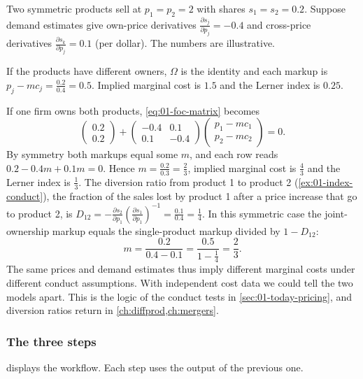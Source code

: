 \begin{example}\label{ex:01-two-products}
Two symmetric products sell at $p_1 = p_2 = 2$ with shares $s_1 = s_2 = 0.2$. Suppose demand estimates give
own-price derivatives $\frac{\partial s_j}{\partial p_j} = -0.4$ and cross-price derivatives
$\frac{\partial s_k}{\partial p_j} = 0.1$ (per dollar). The numbers are illustrative.

If the products have different owners, $\Omega$ is the identity and each markup is
$p_j - mc_j = \frac{0.2}{0.4} = 0.5$. Implied marginal cost is $1.5$ and the Lerner index is $0.25$.

If one firm owns both products, \eqref{eq:01-foc-matrix} becomes
\[
  \begin{pmatrix} 0.2 \\ 0.2 \end{pmatrix}
  + \begin{pmatrix} -0.4 & 0.1 \\ 0.1 & -0.4 \end{pmatrix}
    \begin{pmatrix} p_1 - mc_1 \\ p_2 - mc_2 \end{pmatrix} = 0 .
\]
By symmetry both markups equal some $m$, and each row reads $0.2 - 0.4m + 0.1m = 0$. Hence
$m = \frac{0.2}{0.3} = \frac{2}{3}$, implied marginal cost is $\frac{4}{3}$ and the Lerner index is
$\frac{1}{3}$. The diversion ratio from product 1 to product 2 (\cref{ex:01-index-conduct}), the fraction
of the sales lost by product 1 after a price increase that go to product 2, is
$D_{12} = -\frac{\partial s_2}{\partial p_1}\left(\frac{\partial s_1}{\partial p_1}\right)^{-1}
= \frac{0.1}{0.4} = \frac{1}{4}$.
In this symmetric case the joint-ownership markup equals the single-product markup divided by $1 - D_{12}$:
\[
  m = \frac{0.2}{0.4 - 0.1} = \frac{0.5}{1 - \frac{1}{4}} = \frac{2}{3} .
\]
The same prices and demand estimates thus imply different marginal costs under different conduct
assumptions. With independent cost data we could tell the two models apart. This is the logic of the
conduct tests in \cref{sec:01-today-pricing}, and diversion ratios return in \cref{ch:diffprod,ch:mergers}.
\end{example}

\subsubsection{The three steps}

 displays the workflow. Each step uses the output of the previous one.

